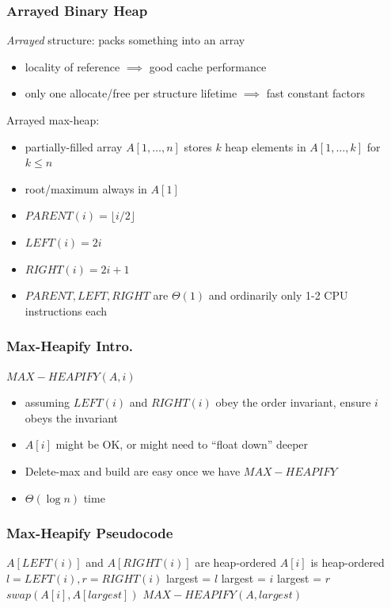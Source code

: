 \documentclass{beamer}
\begin{document}
\begin{frame} \frametitle{Arrayed Binary Heap}

\emph{Arrayed} structure: packs something into an array
\begin{itemize}
  \item locality of reference $\implies$ good cache performance
  \item only one allocate/free per structure lifetime $\implies$ fast constant factors
\end{itemize}

Arrayed max-heap:
\begin{itemize}
  \item partially-filled array $A[1, \ldots, n]$ stores $k$ heap elements in $A[1, \ldots, k]$ for $k \leq n$
  \item root/maximum always in $A[1]$
  \item $PARENT(i) = \lfloor i/2 \rfloor$
  \item $LEFT(i) = 2i$
  \item $RIGHT(i) = 2i+1$
  \item $PARENT, LEFT, RIGHT$ are $\Theta(1)$ and ordinarily only 1-2 CPU instructions each
\end{itemize}

\end{frame}

\begin{frame} \frametitle{Max-Heapify Intro.}

$MAX-HEAPIFY(A, i)$
\begin{itemize}
  \item assuming $LEFT(i)$ and $RIGHT(i)$ obey the order invariant, ensure $i$
    obeys the invariant
  \item $A[i]$ might be OK, or might need to ``float down'' deeper
  \item Delete-max and build are easy once we have $MAX-HEAPIFY$
  \item $\Theta(\log n)$ time
\end{itemize}
\end{frame}

\begin{frame} \frametitle{Max-Heapify Pseudocode}
{\small
\begin{algorithmic}[1]
  \Require $A[LEFT(i)]$ and $A[RIGHT(i)]$ are heap-ordered
  \Ensure $A[i]$ is heap-ordered
  \State $l = LEFT(i), r = RIGHT(i)$
    \State largest = $l$
  \Else
    \State largest = $i$
  \EndIf
    \State largest = $r$
  \EndIf
    \State $swap(A[i], A[largest])$
    \State $MAX-HEAPIFY(A, largest)$
  \EndIf
  \EndFunction
\end{algorithmic}
} %
\end{frame}
\end{document}
